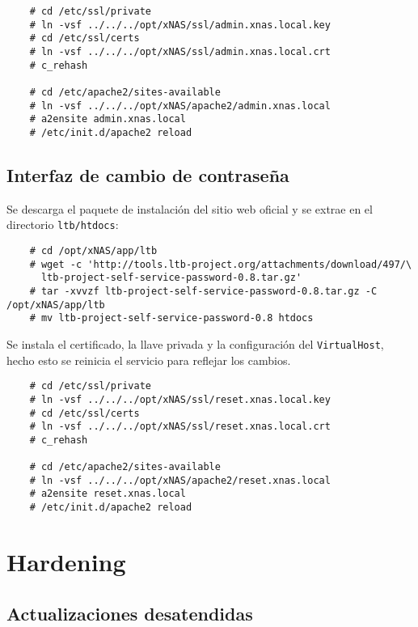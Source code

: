 {
\scriptsize
\linespread{1}
\begin{verbatim}
    # cd /etc/ssl/private
    # ln -vsf ../../../opt/xNAS/ssl/admin.xnas.local.key
    # cd /etc/ssl/certs
    # ln -vsf ../../../opt/xNAS/ssl/admin.xnas.local.crt
    # c_rehash

    # cd /etc/apache2/sites-available
    # ln -vsf ../../../opt/xNAS/apache2/admin.xnas.local
    # a2ensite admin.xnas.local
    # /etc/init.d/apache2 reload
\end{verbatim}
}

      \subsection {Interfaz de cambio de contrase\~{n}a}

Se descarga el paquete de instalaci\'{o}n del sitio web oficial y se extrae en el directorio \texttt{ltb/htdocs}:

{
\scriptsize
\linespread{1}
\begin{verbatim}
    # cd /opt/xNAS/app/ltb
    # wget -c 'http://tools.ltb-project.org/attachments/download/497/\
      ltb-project-self-service-password-0.8.tar.gz'
    # tar -xvvzf ltb-project-self-service-password-0.8.tar.gz -C /opt/xNAS/app/ltb
    # mv ltb-project-self-service-password-0.8 htdocs
\end{verbatim}
}

Se instala el certificado, la llave privada y la configuraci\'{o}n del \texttt{VirtualHost}, hecho esto se reinicia el servicio para reflejar los cambios.

{
\scriptsize
\linespread{1}
\begin{verbatim}
    # cd /etc/ssl/private
    # ln -vsf ../../../opt/xNAS/ssl/reset.xnas.local.key
    # cd /etc/ssl/certs
    # ln -vsf ../../../opt/xNAS/ssl/reset.xnas.local.crt
    # c_rehash

    # cd /etc/apache2/sites-available
    # ln -vsf ../../../opt/xNAS/apache2/reset.xnas.local
    # a2ensite reset.xnas.local
    # /etc/init.d/apache2 reload
\end{verbatim}
}

    \section {Hardening}

      \subsection {Actualizaciones desatendidas}

